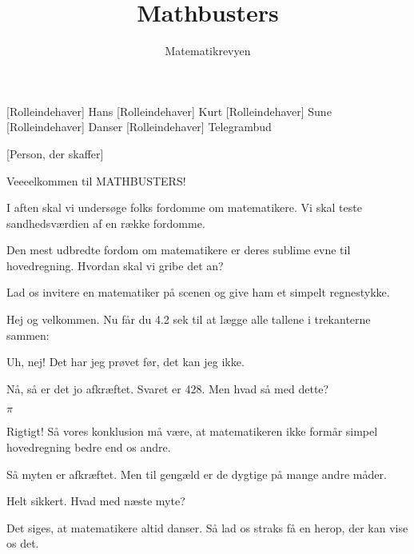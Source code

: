 \documentclass[a4paper,11pt]{article}
\title{Mathbusters}
\author{Matematikrevyen}
\begin{document}
\maketitle

\begin{roles}
[Rolleindehaver] Hans
[Rolleindehaver] Kurt
[Rolleindehaver] Sune
[Rolleindehaver] Danser
[Rolleindehaver] Telegrambud
\end{roles}

\begin{props}
[Person, der skaffer]
\end{props}

\begin{sketch}

 Veeeelkommen til MATHBUSTERS!

 I aften skal vi undersøge folks fordomme om matematikere. Vi skal teste sandhedsværdien af en række fordomme.

 Den mest udbredte fordom om matematikere er deres sublime evne til hovedregning. Hvordan skal vi gribe det an?

 Lad os invitere en matematiker på scenen og give ham et simpelt regnestykke.


 Hej og velkommen. Nu får du 4.2 sek til at lægge alle tallene i trekanterne sammen: 

 Uh, nej! Det har jeg prøvet før, det kan jeg ikke.

 Nå, så er det jo afkræftet. Svaret er 428. Men hvad så med dette? 

  $\pi$

 Rigtigt! Så vores konklusion må være, at matematikeren ikke formår simpel hovedregning bedre end os andre.

 Så myten er afkræftet. Men til gengæld er de dygtige på mange andre måder.

 Helt sikkert. Hvad med næste myte?

 Det siges, at matematikere altid danser. Så lad os straks få en herop, der kan vise os det.


\end{sketch}
\end{document}

